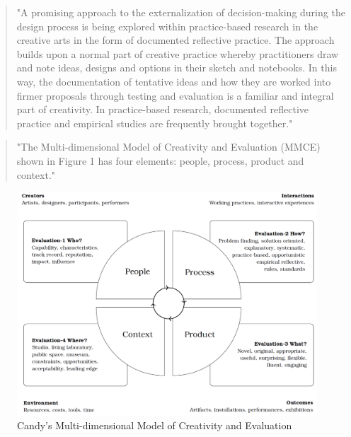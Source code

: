 \begin{quote}
"A promising approach to the externalization of decision-making during the design process is being explored within practice-based research in the creative arts in the form of documented reflective practice. The approach builds upon a normal part of creative practice whereby practitioners draw and note ideas, designs and options in their sketch and notebooks. In this way, the documentation of tentative ideas and how they are worked into firmer proposals through testing and evaluation is a familiar and integral part of creativity. In practice-based research, documented reflective practice and empirical studies are frequently brought together." \citep[p.10]{Candy2012}
\end{quote}

\begin{quote}
"The Multi-dimensional Model of Creativity and Evaluation (MMCE) shown in Figure 1 has four elements: people, process, product and context." \citep[p.11]{Candy2012}
\end{quote}

\begin{figure}[!htb] %
  \centering
    \includegraphics{images/mmce.png}
  \caption[Multi-dimensional Model of Creativity and Evaluation]{Candy's Multi-dimensional Model of Creativity and Evaluation}
  \label{fig:mmce}
\end{figure}

